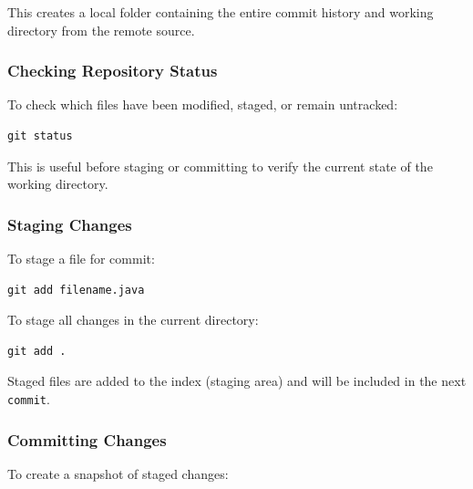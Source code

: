 \documentclass{article}
\newcommand{\codecmd}[1]{\textcolor[rgb]{0,0.5,0}{\texttt{#1}}}
\begin{document}
\noindent This creates a local folder containing the entire commit history and working directory from the remote source.

\subsubsection{Checking Repository Status}

To check which files have been modified, staged, or remain untracked:

\begin{tcolorbox}[colback=mintgreen, colframe=green!40!black, boxrule=0.5pt, sharp corners]
\begin{verbatim}
git status
\end{verbatim}
\end{tcolorbox}

\noindent This is useful before staging or committing to verify the current state of the working directory.

\subsubsection{Staging Changes}

To stage a file for commit:

\begin{tcolorbox}[colback=mintgreen, colframe=green!40!black, boxrule=0.5pt, sharp corners]
\begin{verbatim}
git add filename.java
\end{verbatim}
\end{tcolorbox}

\noindent To stage all changes in the current directory:

\begin{tcolorbox}[colback=mintgreen, colframe=green!40!black, boxrule=0.5pt, sharp corners]
\begin{verbatim}
git add .
\end{verbatim}
\end{tcolorbox}

\noindent Staged files are added to the index (staging area) and will be included in the next \codecmd{commit}.

\subsubsection{Committing Changes}

To create a snapshot of staged changes:
\end{document}
